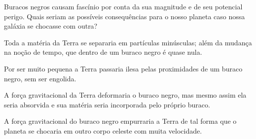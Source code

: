 Buracos negros causam fascínio por conta da sua magnitude e de seu potencial
perigo. Quais seriam as possíveis consequências para o nosso planeta
caso nossa galáxia se chocasse com outra?

\begin{escolha}
\item
  Toda a matéria da Terra se separaria em partículas minúsculas; além da mudança na
  noção de tempo, que dentro de um buraco negro é quase nula.
\item
  Por ser muito pequena a Terra passaria ilesa pelas proximidades de um
  buraco negro, sem ser engolida.
\item
  A força gravitacional da Terra deformaria o buraco negro, mas mesmo
  assim ela seria absorvida e sua matéria seria incorporada pelo próprio buraco.
\item
  A força gravitacional do buraco negro empurraria a Terra de tal forma
  que o planeta se chocaria em outro corpo celeste com muita velocidade.
\end{escolha}

